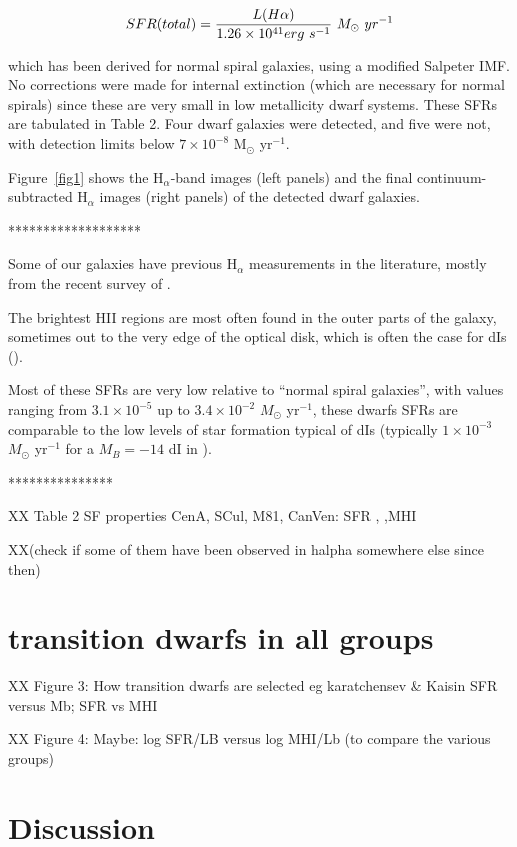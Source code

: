\documentclass[12pt,preprint]{emulateapj}
\begin{document}
\begin{equation}
SFR(total) = {{L(H\alpha )}\over{1.26\times 10^{41} erg\  s^{-1}}}\
M_\odot\  yr^{-1}
\end{equation}

which has been derived for normal spiral galaxies, using a modified Salpeter IMF.  No corrections were made for internal extinction (which are necessary 
for normal spirals) since these are very small in low metallicity dwarf systems. These SFRs are tabulated in Table 2.
Four dwarf galaxies were detected, and five were not, with detection limits below $7\times 10^{-8}$ M$_{\odot}$ yr$^{-1}$.

Figure~\ref{fig1} shows the H$_\alpha$-band images (left panels) and the final continuum-subtracted H$_\alpha$ images (right panels) of the detected 
dwarf galaxies. 
 

*******************


Some of our galaxies have previous H$_\alpha$ measurements in the literature, mostly from the recent survey of \cite{kl08}. 

The brightest HII regions are most often found in the outer parts of the galaxy, sometimes out to the very edge of the optical disk, which is often the case 
for dIs (\cite{bha98}). 

Most of these SFRs are very low relative to ``normal spiral galaxies'', with values ranging from $3.1\times 10^{-5}$ up to 
$3.4\times 10^{-2}$ $M_{\odot}$ yr$^{-1}$, these dwarfs SFRs are comparable to the low levels of star formation typical of dIs (typically 
$1\times 10^{-3}$ $M_{\odot}$ yr$^{-1}$ for a $M_B=-14$ dI in \cite{kk07}). 



***************

XX Table 2 SF properties CenA, SCul, M81, CanVen: SFR , ,MHI 
 
XX(check if some of them have been observed in halpha somewhere else since then)


\section{transition dwarfs in all groups}

XX Figure 3: How transition dwarfs are selected eg karatchensev \& Kaisin SFR versus Mb; SFR vs MHI
 
XX Figure 4: Maybe: log SFR/LB versus log MHI/Lb (to compare the various groups)


\section{Discussion} 
\end{document}
